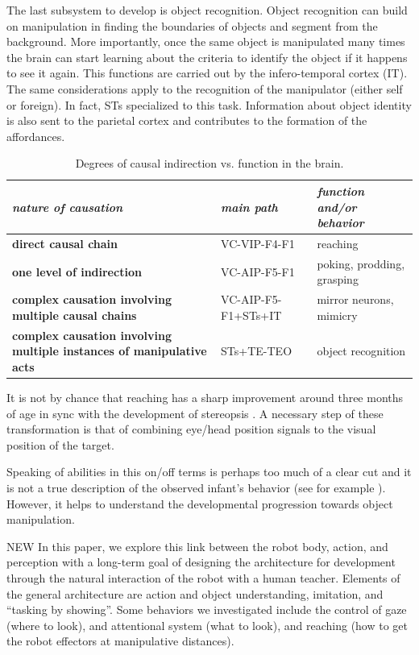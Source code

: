 The last subsystem to develop is object recognition. Object 
recognition can build on manipulation in finding the boundaries
of objects and segment from the background. More importantly,
once the same object is manipulated many times the brain can
start learning about the criteria to identify the object if 
it happens to see it again. This functions are
carried out by the infero-temporal cortex (IT).
The same considerations apply to the recognition of the 
manipulator (either self or foreign). In fact, STs specialized
to this task. Information about object identity is
also sent to the parietal cortex and contributes to 
the formation of the affordances.


\begin{table}[htbp]
\begin{center}
\begin{tabular}{|p{3.5cm}|p{2.5cm}|p{4.5cm}|}
\hline
{\it nature of causation} & {\it main path} &  {\it function and/or behavior} \\ \hline\hline
{\bf direct causal chain} & VC-VIP-F4-F1 & reaching\\ \hline
{\bf one level of indirection} & VC-AIP-F5-F1 & poking, prodding, grasping\\ \hline
{\bf complex causation involving multiple causal chains} & VC-AIP-F5-F1+STs+IT & mirror neurons, mimicry\\ \hline
{\bf complex causation involving multiple instances of manipulative acts} & STs+TE-TEO & object recognition\\ \hline
\end{tabular}
\caption{
\label{tab:circuits}
%
Degrees of causal indirection vs. function in the brain.
%
}
\end{center}
\end{table}


\ifverbose
It is not by chance that reaching has 
a sharp improvement around three months of age in sync with the
development of stereopsis \cite{}. A necessary step of these 
transformation is that of combining eye/head position signals to 
the visual position of the target. 
\fi

\ifverbose
Speaking of abilities in this on/off terms is 
perhaps too much of a clear cut and it is not a true description
of the observed infant's behavior (see for example \cite{Streri}). 
However, it helps to understand the developmental progression towards 
object manipulation. 
\fi
 


\ifverbose
NEW In this paper, we explore this link between the robot body, action,
and perception with a long-term goal of designing the architecture for
development through the natural interaction of the robot with a human
teacher. Elements of the general architecture are action and object
understanding, imitation, and ``tasking by showing''. Some behaviors
we investigated include the control of gaze (where to look), and
attentional system (what to look), and reaching (how to get the robot
effectors at manipulative distances).
\fi

